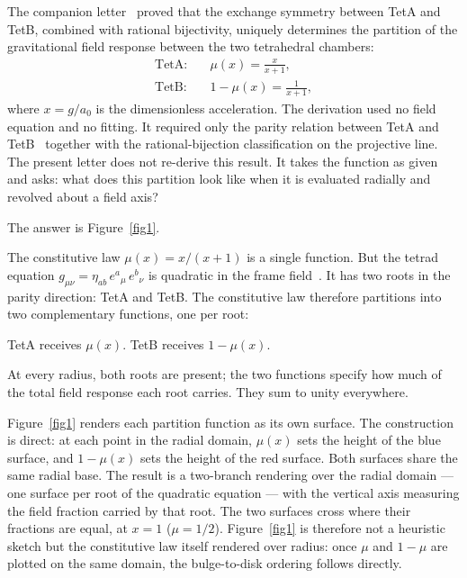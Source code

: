 \documentclass[twocolumn]{iopjournal}
\begin{document}
The companion letter~\cite{Nelson2026b} proved that the
exchange symmetry between TetA and TetB, combined with
rational bijectivity, uniquely determines the partition of
the gravitational field response between the two tetrahedral
chambers:
\begin{align}
  \text{TetA:} \quad & \mu(x) = \frac{x}{x + 1},
  \label{eq:mu} \\[4pt]
  \text{TetB:} \quad & 1 - \mu(x) = \frac{1}{x + 1},
  \label{eq:tetb}
\end{align}
where $x = g/a_0$ is the dimensionless acceleration.  The
derivation used no field equation and no fitting.  It required
only the parity relation between TetA and
TetB~\cite{Nelson2026a} together with the rational-bijection
classification on the projective line.  The present letter does
not re-derive this result.  It takes the function as given and
asks: what does this partition look like when it is evaluated
radially and revolved about a field axis?

The answer is Figure~\ref{fig1}.

The constitutive law $\mu(x) = x/(x{+}1)$ is a single
function.  But the tetrad equation
$g_{\mu\nu} = \eta_{ab}\,e^a{}_\mu\,e^b{}_\nu$ is quadratic
in the frame field~\cite{Nelson2026a}.  It has two roots in
the parity direction: TetA and TetB.  The constitutive law
therefore partitions into two complementary functions, one per
root:
\begin{center}
TetA receives $\mu(x)$. \quad TetB receives $1 - \mu(x)$.
\end{center}
At every radius, both roots are present; the two functions
specify how much of the total field response each root
carries.  They sum to unity everywhere.

Figure~\ref{fig1} renders each partition function as its own
surface.  The construction is direct: at each point in the
radial domain, $\mu(x)$ sets the height of the blue surface,
and $1 - \mu(x)$ sets the height of the red surface.  Both
surfaces share the same radial base.  The result is a
two-branch rendering over the radial domain --- one surface per
root of the quadratic equation --- with the vertical axis
measuring the field fraction carried by that root.  The two
surfaces cross where their fractions are equal, at $x = 1$
($\mu = 1/2$).  Figure~\ref{fig1} is therefore not a
heuristic sketch but the constitutive law itself rendered over
radius: once $\mu$ and $1 - \mu$ are plotted on the same
domain, the bulge-to-disk ordering follows directly.
\end{document}
